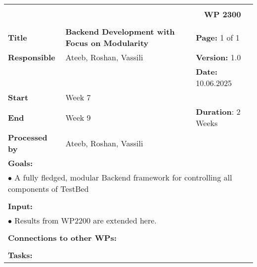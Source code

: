 \begin{table}[!h]
    \begin{center}
        \begin{tabular}{|p{}||p{}|p{}||p{}|}
            \hline
            \multicolumn{3}{|l||}{\textbf{}} & \multicolumn{1}{c|}{}\\
            \multicolumn{3}{|l||}{\textbf{}} & \multicolumn{1}{c|}{\textbf{WP 2300}}\\
            \multicolumn{3}{|l||}{\textbf{}} & \multicolumn{1}{c|}{}\\
            \hline\hline
            \textbf{Title} & \multicolumn{2}{p{.40\columnwidth}||}{\textbf{Backend Development with Focus on Modularity}}
            & \textbf{Page:} 1 of 1\\
            \hline
            \textbf{Responsible} & \multicolumn{2}{l||}{Ateeb, Roshan, Vassili} & \textbf{Version:} 1.0\\
            \hline
            \multicolumn{3}{|l||}{} & \textbf{Date:} 10.06.2025 \\
            \hline\hline
            \textbf{Start} & \multicolumn{2}{l||}{Week 7} & \\
            \hline
            \textbf{End} & \multicolumn{2}{l||}{Week 9} & \textbf{Duration}: 2 Weeks\\
            \hline\hline
            \textbf{Processed by} & \multicolumn{3}{l|}{Ateeb, Roshan, Vassili}\\
            \hline\hline
            \multicolumn{4}{|p{.95\columnwidth}|}{\textbf{Goals:}}\\
            \multicolumn{4}{|p{.95\columnwidth}|}{$\bullet$ A fully fledged, modular Backend framework for controlling all components of TestBed}\\
            \multicolumn{4}{|p{.95\columnwidth}|}{}\\
            \multicolumn{4}{|p{.95\columnwidth}|}{\textbf{Input:}}\\
            \multicolumn{4}{|p{.95\columnwidth}|}{$\bullet$ Results from WP2200 are extended here.}\\
            \multicolumn{4}{|p{.95\columnwidth}|}{}\\
            \multicolumn{4}{|p{.95\columnwidth}|}{\textbf{Connections to other WPs:}}\\
            \multicolumn{4}{|p{.95\columnwidth}|}{}\\
            \multicolumn{4}{|p{.95\columnwidth}|}{\textbf{Tasks:}}\\

\end{tabular}
\end{center}
\end{table}
